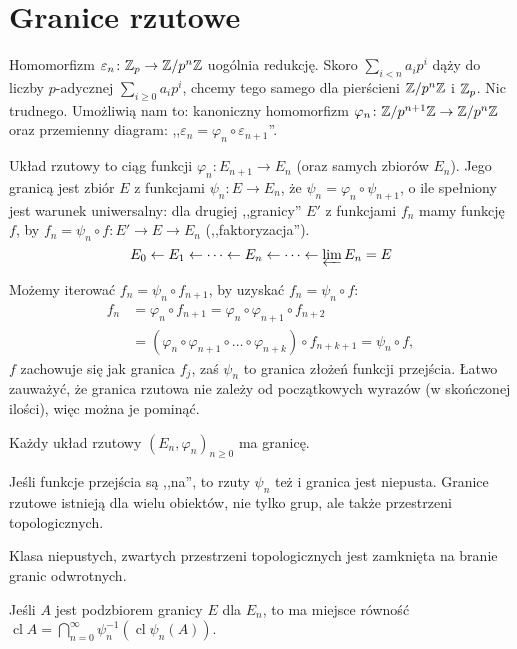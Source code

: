 \section{Granice rzutowe}
Homomorfizm $\varepsilon_n \colon \mathbb Z_p \to \mathbb Z/p^n\mathbb Z$ uogólnia redukcję.
Skoro $\sum_{i < n} a_ip^i$ dąży do liczby $p$-adycznej $\sum_{i \ge 0} a_i p^i$, chcemy tego samego dla pierścieni $\mathbb Z/p^n\mathbb Z$ i $\mathbb Z_p$.
Nic trudnego.
Umożliwią nam to: kanoniczny homomorfizm $\varphi_n \colon \mathbb Z/p^{n+1} \mathbb Z \to \mathbb Z / p^n \mathbb Z$ oraz przemienny diagram: ,,$\varepsilon_n = \varphi_n \circ \varepsilon_{n+1}$''.

\begin{definicja}
	Układ rzutowy to ciąg funkcji $\varphi_n \colon E_{n+1} \to E_n$ (oraz samych zbiorów $E_n$). 
	Jego granicą jest zbiór $E$ z funkcjami $\psi_n \colon E \to E_n$, że $\psi_n = \varphi_n \circ \psi_{n+1}$, o ile spełniony jest warunek uniwersalny: dla drugiej ,,granicy'' $E'$ z funkcjami $f_n$ mamy funkcję $f$, by $f_n = \psi_n \circ f \colon E' \to E \to E_n$ (,,faktoryzacja'').
\[
	E_0 \leftarrow E_1 \leftarrow \dots \leftarrow E_n \leftarrow \dots \leftarrow \varprojlim E_n = E
\]
\end{definicja}

Możemy iterować $f_n = \psi_n \circ f_{n+1}$, by uzyskać $f_n = \psi_n \circ f$:
\begin{align*}
	f_n & = \varphi_n \circ f_{n+1} = \varphi_n \circ \varphi_{n+1} \circ f_{n+2} \\
	& = (\varphi_n \circ \varphi_{n+1} \circ \ldots \circ \varphi_{n+k}) \circ f_{n+k+1} = \psi_n \circ f,
\end{align*}
$f$ zachowuje się jak granica $f_j$, zaś $\psi_n$ to granica złożeń funkcji przejścia.
Łatwo zauważyć, że granica rzutowa nie zależy od początkowych wyrazów (w skończonej ilości), więc można je pominąć.

\begin{fakt}
	Każdy układ rzutowy $(E_n, \varphi_n)_{n \ge 0}$ ma granicę.
\end{fakt}

Jeśli funkcje przejścia są ,,na'', to rzuty $\psi_n$ też i granica jest niepusta.
Granice rzutowe istnieją dla wielu obiektów, nie tylko grup, ale także przestrzeni topologicznych.

\begin{fakt}
	Klasa niepustych, zwartych przestrzeni topologicznych jest zamknięta na branie granic odwrotnych.
\end{fakt}

\begin{fakt}
	Jeśli $A$ jest podzbiorem granicy $E$ dla $E_n$, to ma miejsce równość $\operatorname{cl} A = \bigcap_{n=0}^\infty \psi_n^{-1} (\operatorname{cl} \psi_n (A))$.
\end{fakt}

